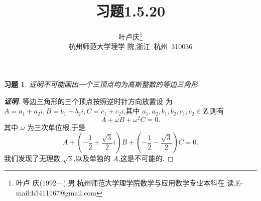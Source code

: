 \documentclass[a4paper]{article}
\newtheorem*{exercise}{习题}
\begin{document}
\title{\huge{\bf{习题1.5.20}}} \author{\small{叶卢庆\footnote{叶卢
      庆(1992---),男,杭州师范大学理学院数学与应用数学专业本科在
      读,E-mail:h5411167@gmail.com}}\\{\small{杭州师范大学理学
      院,浙江~杭州~310036}}}
\maketitle
\begin{exercise}
  证明不可能画出一个三顶点均为高斯整数的等边三角形.
\end{exercise}
\begin{proof}[\textbf{证明}]
  等边三角形的三个顶点按照逆时针方向放置设
  为$A=a_1+a_2i,B=b_1+b_2i,C=c_1+c_2i$,其中
  $a_1,a_2,b_1,b_2,c_1,c_2\in \mathbf{Z}$.则有
$$
A+\omega B+\omega^2C=0.
$$
其中 $\omega$ 为三次单位根.于是
$$
A+(-\frac{1}{2}+\frac{\sqrt{3}}{2}i)B+(-\frac{1}{2}-\frac{\sqrt{3}}{2})C=0.
$$
我们发现了无理数 $\sqrt{3}$,以及单独的 $A$,这是不可能的.
\end{proof}
\end{document}
